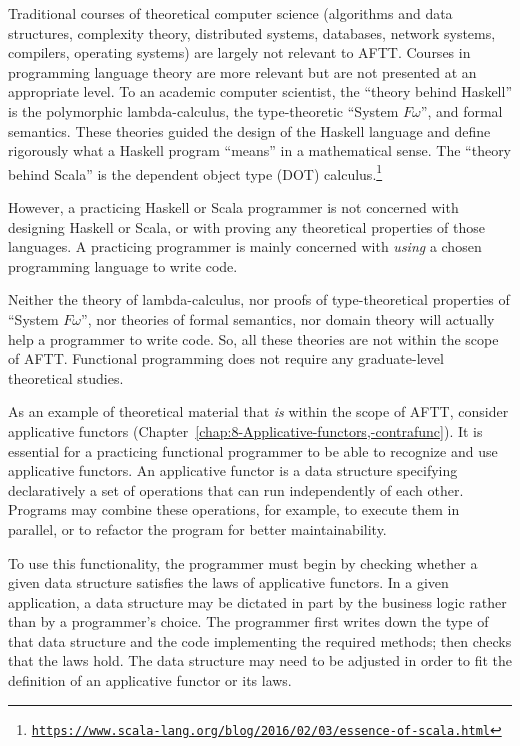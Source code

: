 Traditional courses of theoretical computer science (algorithms and
data structures, complexity theory, distributed systems, databases,
network systems, compilers, operating systems) are largely not relevant
to AFTT. Courses in programming language theory are more relevant
but are not presented at an appropriate level. To an academic computer
scientist, the \textsf{``}theory behind Haskell\textsf{''} is the polymorphic lambda-calculus,
the type-theoretic \textsf{``}System $F\omega$\textsf{''}, and formal semantics.
These theories guided the design of the Haskell language and define
rigorously what a Haskell program \textsf{``}means\textsf{''} in a mathematical sense.
The \textsf{``}theory behind Scala\textsf{''} is the dependent object type (DOT) calculus.\footnote{\texttt{\href{https://www.scala-lang.org/blog/2016/02/03/essence-of-scala.html}{https://www.scala-lang.org/blog/2016/02/03/essence-of-scala.html}}}

However, a practicing Haskell or Scala programmer is not concerned
with designing Haskell or Scala, or with proving any theoretical properties
of those languages. A practicing programmer is mainly concerned with
\emph{using} a chosen programming language to write code. 

Neither the theory of lambda-calculus, nor proofs of type-theoretical
properties of \textsf{``}System $F\omega$\textsf{''}, nor theories of formal semantics,
nor domain theory will actually help a programmer to write code. So,
all these theories are not within the scope of AFTT. Functional programming
does not require any graduate-level theoretical studies.

As an example of theoretical material that \emph{is} within the scope
of AFTT, consider applicative functors (Chapter~\ref{chap:8-Applicative-functors,-contrafunc}).
It is essential for a practicing functional programmer to be able
to recognize and use applicative functors. An applicative functor
is a data structure specifying declaratively a set of operations that
can run independently of each other. Programs may combine these operations,
for example, to execute them in parallel, or to refactor the program
for better maintainability.

To use this functionality, the programmer must begin by checking whether
a given data structure satisfies the laws of applicative functors.
In a given application, a data structure may be dictated in part by
the business logic rather than by a programmer\textsf{'}s choice. The programmer
first writes down the type of that data structure and the code implementing
the required methods; then checks that the laws hold. The data structure
may need to be adjusted in order to fit the definition of an applicative
functor or its laws.

